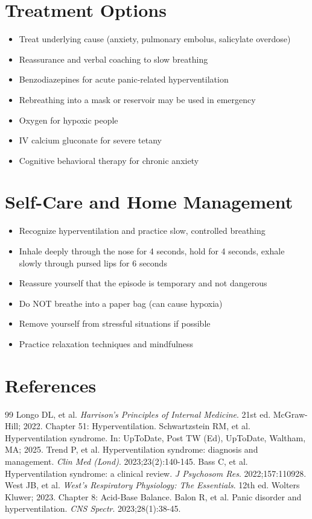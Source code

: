 \section*{Treatment Options}
\begin{itemize}
\item Treat underlying cause (anxiety, pulmonary embolus, salicylate overdose)
\item Reassurance and verbal coaching to slow breathing
\item Benzodiazepines for acute panic-related hyperventilation
\item Rebreathing into a mask or reservoir may be used in emergency
\item Oxygen for hypoxic people
\item IV calcium gluconate for severe tetany
\item Cognitive behavioral therapy for chronic anxiety
\end{itemize}

\section*{Self-Care and Home Management}
\begin{itemize}
\item Recognize hyperventilation and practice slow, controlled breathing
\item Inhale deeply through the nose for 4 seconds, hold for 4 seconds, exhale slowly through pursed lips for 6 seconds
\item Reassure yourself that the episode is temporary and not dangerous
\item Do NOT breathe into a paper bag (can cause hypoxia)
\item Remove yourself from stressful situations if possible
\item Practice relaxation techniques and mindfulness
\end{itemize}

\section*{References}

\begin{thebibliography}{99}
 Longo DL, et al. \emph{Harrison's Principles of Internal Medicine}. 21st ed. McGraw-Hill; 2022. Chapter 51: Hyperventilation.
 Schwartzstein RM, et al. Hyperventilation syndrome. In: UpToDate, Post TW (Ed), UpToDate, Waltham, MA; 2025.
 Trend P, et al. Hyperventilation syndrome: diagnosis and management. \emph{Clin Med (Lond)}. 2023;23(2):140-145.
 Bass C, et al. Hyperventilation syndrome: a clinical review. \emph{J Psychosom Res}. 2022;157:110928.
 West JB, et al. \emph{West's Respiratory Physiology: The Essentials}. 12th ed. Wolters Kluwer; 2023. Chapter 8: Acid-Base Balance.
 Balon R, et al. Panic disorder and hyperventilation. \emph{CNS Spectr}. 2023;28(1):38-45.
\end{thebibliography}
